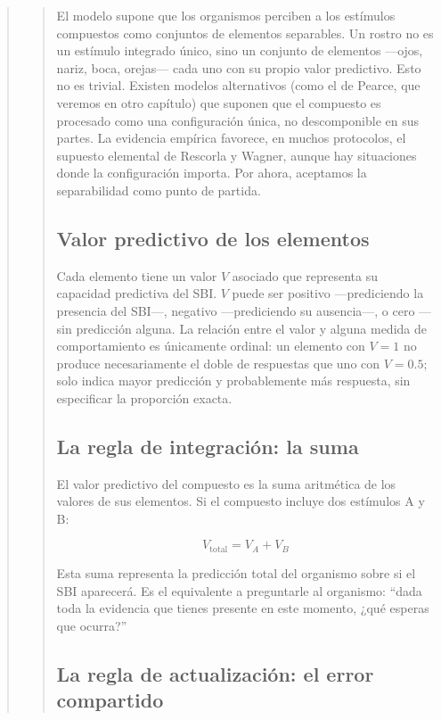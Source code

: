 \documentclass[
  letterpaper,
  DIV=11,
  numbers=noendperiod]{scrreprt}
\begin{document}
\begin{tcolorbox}[enhanced jigsaw, arc=.35mm, bottomrule=.15mm, breakable, colback=white, colframe=quarto-callout-note-color-frame, left=2mm, leftrule=.75mm, opacityback=0, rightrule=.15mm, toprule=.15mm]
\begin{quote}
\begin{quote}
El modelo supone que los organismos perciben a los estímulos compuestos
como conjuntos de elementos separables. Un rostro no es un estímulo
integrado único, sino un conjunto de elementos ---ojos, nariz, boca,
orejas--- cada uno con su propio valor predictivo. Esto no es trivial.
Existen modelos alternativos (como el de Pearce, que veremos en otro
capítulo) que suponen que el compuesto es procesado como una
configuración única, no descomponible en sus partes. La evidencia
empírica favorece, en muchos protocolos, el supuesto elemental de
Rescorla y Wagner, aunque hay situaciones donde la configuración
importa. Por ahora, aceptamos la separabilidad como punto de partida.

\mbox{}%
\subsection{Valor predictivo de los
elementos}\label{valor-predictivo-de-los-elementos}

Cada elemento tiene un valor \(V\) asociado que representa su capacidad
predictiva del SBI. \(V\) puede ser positivo ---prediciendo la presencia
del SBI---, negativo ---prediciendo su ausencia---, o cero ---sin
predicción alguna. La relación entre el valor y alguna medida de
comportamiento es únicamente ordinal: un elemento con \(V = 1\) no
produce necesariamente el doble de respuestas que uno con \(V = 0.5\);
solo indica mayor predicción y probablemente más respuesta, sin
especificar la proporción exacta.

\mbox{}%
\subsection{La regla de integración: la
suma}\label{la-regla-de-integraciuxf3n-la-suma}

El valor predictivo del compuesto es la suma aritmética de los valores
de sus elementos. Si el compuesto incluye dos estímulos A y B:

\[V_{\text{total}} = V_A + V_B\]

Esta suma representa la predicción total del organismo sobre si el SBI
aparecerá. Es el equivalente a preguntarle al organismo: ``dada toda la
evidencia que tienes presente en este momento, ¿qué esperas que
ocurra?''

\mbox{}%
\subsection{La regla de actualización: el error
compartido}\label{la-regla-de-actualizaciuxf3n-el-error-compartido}


\end{quote}
\end{quote}
\end{tcolorbox}
\end{document}
